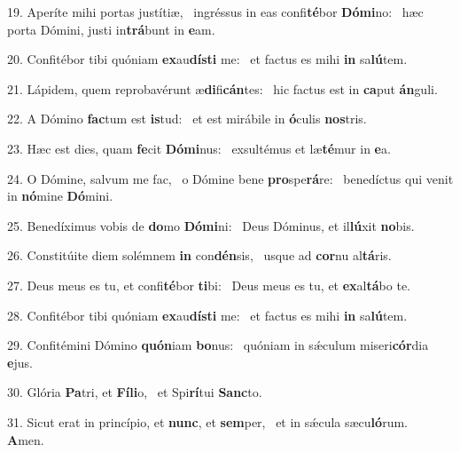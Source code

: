 19. Aperíte mihi portas justítiæ, \dag\  ingréssus in eas confi\textbf{té}bor \textbf{Dó}\textbf{mi}no: \ast\  hæc porta Dómini, justi in\textbf{trá}bunt in \textbf{e}am.\

20. Confitébor tibi quóniam \textbf{ex}au\textbf{dís}\textbf{ti} me: \ast\  et factus es mihi \textbf{in} sa\textbf{lú}tem.\

21. Lápidem, quem reprobavérunt æ\textbf{di}fi\textbf{cán}tes: \ast\  hic factus est in \textbf{ca}put \textbf{án}guli.\

22. A Dómino \textbf{fac}tum est \textbf{is}tud: \ast\  et est mirábile in \textbf{ó}culis \textbf{nos}tris.\

23. Hæc est dies, quam \textbf{fe}cit \textbf{Dó}\textbf{mi}nus: \ast\  exsultémus et læ\textbf{té}mur in \textbf{e}a.\

24. O Dómine, salvum me fac, \dag\  o Dómine bene \textbf{pro}spe\textbf{rá}re: \ast\  benedíctus qui venit in \textbf{nó}mine \textbf{Dó}mini.\

25. Benedíximus vobis de \textbf{do}mo \textbf{Dó}\textbf{mi}ni: \ast\  Deus Dóminus, et il\textbf{lú}xit \textbf{no}bis.\

26. Constitúite diem solémnem \textbf{in} con\textbf{dén}sis, \ast\  usque ad \textbf{cor}nu al\textbf{tá}ris.\

27. Deus meus es tu, et confi\textbf{té}bor \textbf{ti}bi: \ast\  Deus meus es tu, et \textbf{ex}al\textbf{tá}bo te.\

28. Confitébor tibi quóniam \textbf{ex}au\textbf{dís}\textbf{ti} me: \ast\  et factus es mihi \textbf{in} sa\textbf{lú}tem.\

29. Confitémini Dómino \textbf{quón}iam \textbf{bo}nus: \ast\  quóniam in sǽculum miseri\textbf{cór}dia \textbf{e}jus.\

30. Glória \textbf{Pa}tri, et \textbf{Fí}\textbf{li}o, \ast\  et Spi\textbf{rí}tui \textbf{Sanc}to.\

31. Sicut erat in princípio, et \textbf{nunc}, et \textbf{sem}per, \ast\  et in sǽcula sæcu\textbf{ló}rum. \textbf{A}men.\

